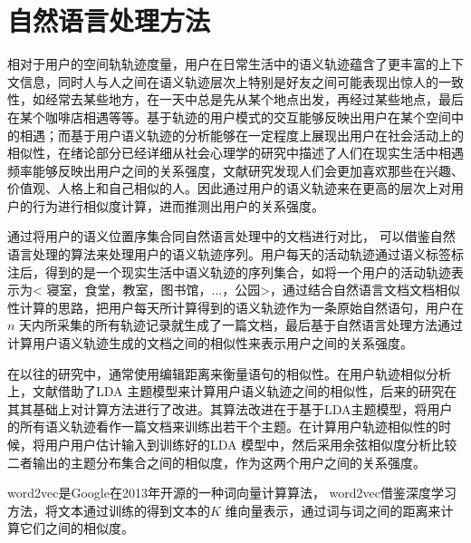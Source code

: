 \section{自然语言处理方法}
\label{sec:section2-3}
相对于用户的空间轨轨迹度量，用户在日常生活中的语义轨迹蕴含了更丰富的上下文信息，同时人与人之间在语义轨迹层次上特别是好友之间可能表现出惊人的一致性，如经常去某些地方，在一天中总是先从某个地点出发，再经过某些地点，最后在某个咖啡店相遇等等。基于轨迹的用户模式的交互能够反映出用户在某个空间中的相遇；而基于用户语义轨迹的分析能够在一定程度上展现出用户在社会活动上的相似性，在绪论部分已经详细从社会心理学的研究中描述了人们在现实生活中相遇频率能够反映出用户之间的关系强度，文献\cite{singelis1994measurement}研究发现人们会更加喜欢那些在兴趣、价值观、人格上和自己相似的人。因此通过用户的语义轨迹来在更高的层次上对用户的行为进行相似度计算，进而推测出用户的关系强度。
\par 通过将用户的语义位置序集合同自然语言处理中的文档进行对比， 可以借鉴自然语言处理的算法来处理用户的语义轨迹序列。用户每天的活动轨迹通过语义标签标注后，得到的是一个现实生活中语义轨迹的序列集合，如将一个用户的活动轨迹表示为< 寝室，食堂，教室，图书馆，...，公园>，通过结合自然语言文档文档相似性计算的思路，把用户每天所计算得到的语义轨迹作为一条原始自然语句，用户在$n$ 天内所采集的所有轨迹记录就生成了一篇文档，最后基于自然语言处理方法通过计算用户语义轨迹生成的文档之间的相似性来表示用户之间的关系强度。
\par 在以往的研究中，通常使用编辑距离来衡量语句的相似性。在用户轨迹相似分析上，文献\cite{farrahi2008did}借助了LDA 主题模型来计算用户语义轨迹之间的相似性，后来的研究在其其基础上对计算方法进行了改进。其算法改进在于基于LDA主题模型，将用户的所有语义轨迹看作一篇文档来训练出若干个主题。在计算用户轨迹相似性的时候，将用户用户估计输入到训练好的LDA 模型中，然后采用余弦相似度分析比较二者输出的主题分布集合之间的相似度，作为这两个用户之间的关系强度。
\par word2vec是Google在2013年开源的一种词向量计算算法， word2vec借鉴深度学习方法，将文本通过训练的得到文本的$K$ 维向量表示，通过词与词之间的距离来计算它们之间的相似度。
